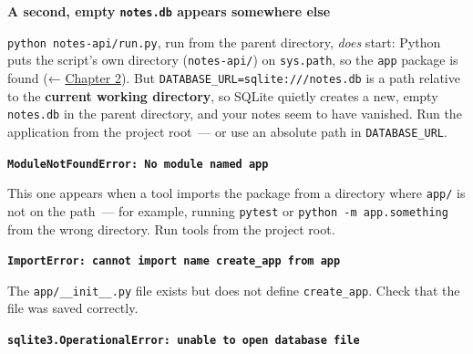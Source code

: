\textbf{A second, empty \texttt{notes.db} appears somewhere else}

\texttt{python\ notes-api/}\allowbreak{}\texttt{run.py}, run from the parent directory, \emph{does} start: Python puts the script's own directory (\texttt{notes-api/}) on \texttt{sys.path}, so the \texttt{app} package is found (← \hyperref[ch:02-runtime-initialization]{Chapter 2}). But \texttt{DATABASE\_}\allowbreak{}\texttt{URL=}\allowbreak{}\texttt{sqlite:}\allowbreak{}\texttt{/}\allowbreak{}\texttt{/}\allowbreak{}\texttt{/}\allowbreak{}\texttt{notes.}\allowbreak{}\texttt{db} is a path relative to the \textbf{current working directory}, so SQLite quietly creates a new, empty \texttt{notes.db} in the parent directory, and your notes seem to have vanished. Run the application from the project root~--- or use an absolute path in \texttt{DATABASE\_URL}.

\begin{codebox}[short]

\begin{Shaded}
\begin{Highlighting}[]

\end{Highlighting}
\end{Shaded}

\end{codebox}

\noindent{}\textbf{\texttt{ModuleNotFoundError:}\allowbreak{}\texttt{\ No\ module\ named\ \textquotesingle{}app\textquotesingle{}}}

This one appears when a tool imports the package from a directory where \texttt{app/} is not on the path~--- for example, running \texttt{pytest} or \texttt{python\ -m\ app.something} from the wrong directory. Run tools from the project root.

\textbf{\texttt{ImportError:}\allowbreak{}\texttt{\ cannot\ import\ name\ \textquotesingle{}create\_}\allowbreak{}\texttt{app\textquotesingle{}\ from\ \textquotesingle{}app\textquotesingle{}}}

The \texttt{app/\_\_init\_\_.py} file exists but does not define \texttt{create\_app}. Check that the file was saved correctly.

\textbf{\texttt{sqlite3.}\allowbreak{}\texttt{OperationalError:}\allowbreak{}\texttt{\ unable\ to\ open\ database\ file}}

